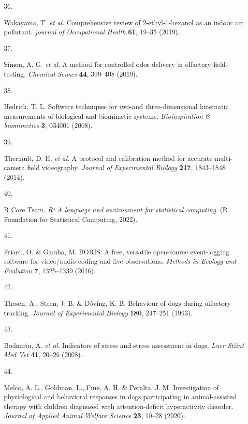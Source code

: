 \documentclass[
]{article}
\newlength{\cslhangindent}
\newlength{\csllabelwidth}
\newlength{\cslentryspacingunit} %
\newenvironment{CSLReferences}[2] %
 {%
  \setlength{\parindent}{0pt}
  \ifodd #1
  \let\oldpar\par
  \def\par{\hangindent=\cslhangindent\oldpar}
  \fi
  \setlength{\parskip}{#2\cslentryspacingunit}
 }%
 {}
\newcommand{\CSLLeftMargin}[1]{\parbox[t]{\csllabelwidth}{#1}}
\newcommand{\CSLRightInline}[1]{\parbox[t]{\linewidth - \csllabelwidth}{#1}\break}
\begin{document}
\begin{CSLReferences}{0}{0}
\leavevmode{}%
\CSLLeftMargin{36. }%
\CSLRightInline{Wakayama, T. \emph{et al.} Comprehensive review of 2-ethyl-1-hexanol as an indoor air pollutant. \emph{journal of Occupational Health} \textbf{61}, 19--35 (2019).}

\leavevmode{}%
\CSLLeftMargin{37. }%
\CSLRightInline{Simon, A. G. \emph{et al.} A method for controlled odor delivery in olfactory field-testing. \emph{Chemical Senses} \textbf{44}, 399--408 (2019).}

\leavevmode{}%
\CSLLeftMargin{38. }%
\CSLRightInline{Hedrick, T. L. Software techniques for two-and three-dimensional kinematic measurements of biological and biomimetic systems. \emph{Bioinspiration \& biomimetics} \textbf{3}, 034001 (2008).}

\leavevmode{}%
\CSLLeftMargin{39. }%
\CSLRightInline{Theriault, D. H. \emph{et al.} A protocol and calibration method for accurate multi-camera field videography. \emph{Journal of Experimental Biology} \textbf{217}, 1843--1848 (2014).}

\leavevmode{}%
\CSLLeftMargin{40. }%
\CSLRightInline{R Core Team. \emph{\href{https://www.R-project.org}{R: A language and environment for statistical computing}}. (R Foundation for Statistical Computing, 2022).}

\leavevmode{}%
\CSLLeftMargin{41. }%
\CSLRightInline{Friard, O. \& Gamba, M. {BORIS}: A free, versatile open-source event-logging software for video/audio coding and live observations. \emph{Methods in Ecology and Evolution} \textbf{7}, 1325--1330 (2016).}

\leavevmode{}%
\CSLLeftMargin{42. }%
\CSLRightInline{Thesen, A., Steen, J. B. \& Dóving, K. B. Behaviour of dogs during olfactory tracking. \emph{Journal of Experimental Biology} \textbf{180}, 247--251 (1993).}

\leavevmode{}%
\CSLLeftMargin{43. }%
\CSLRightInline{Bodnariu, A. \emph{et al.} Indicators of stress and stress assessment in dogs. \emph{Lucr Stiint Med Vet} \textbf{41}, 20--26 (2008).}

\leavevmode{}%
\CSLLeftMargin{44. }%
\CSLRightInline{Melco, A. L., Goldman, L., Fine, A. H. \& Peralta, J. M. Investigation of physiological and behavioral responses in dogs participating in animal-assisted therapy with children diagnosed with attention-deficit hyperactivity disorder. \emph{Journal of Applied Animal Welfare Science} \textbf{23}, 10--28 (2020).}


\end{CSLReferences}
\end{document}
